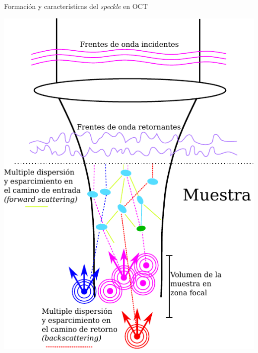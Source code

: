 \documentclass[fleqn,10pt]{beamer}
\begin{document}
\begin{frame}{Formación y características del \emph{speckle} en OCT}
\begin{multicols}{2}
		\includegraphics[width=1\linewidth]{AAUgraphics/pt3/sample_backscattering}
		
	\end{multicols}
\end{frame}
\end{document}
